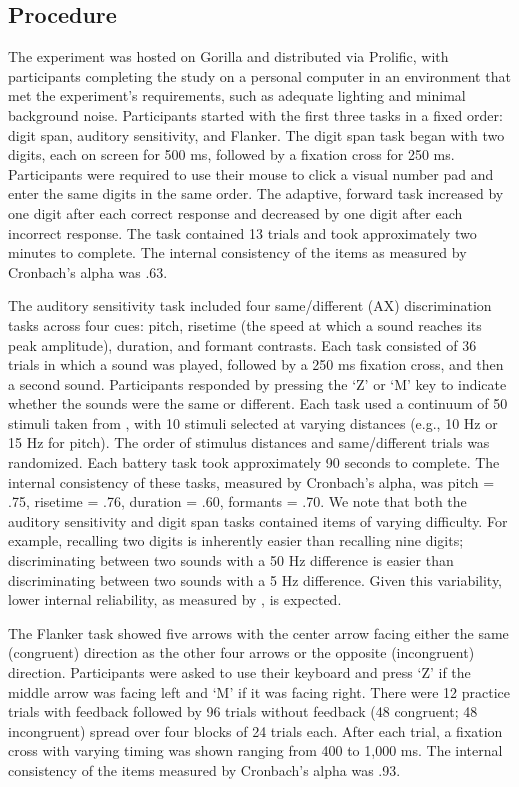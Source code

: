 \subsection{Procedure}

The experiment was hosted on Gorilla \parencite{Anwyl-Irvine_2019} and distributed via Prolific, with participants completing the study on a personal computer in an environment that met the experiment’s requirements, such as adequate lighting and minimal background noise. Participants started with the first three tasks in a fixed order: digit span, auditory sensitivity, and Flanker. The digit span task began with two digits, each on screen for 500 ms, followed by a fixation cross for 250 ms. Participants were required to use their mouse to click a visual number pad and enter the same digits in the same order. The adaptive, forward task increased by one digit after each correct response and decreased by one digit after each incorrect response. The task contained 13 trials and took approximately two minutes to complete. The internal consistency of the items as measured by Cronbach's alpha was .63. 

The auditory sensitivity task included four same/different (AX) discrimination tasks across four cues:  pitch, risetime (the speed at which a sound reaches its peak amplitude), duration, and formant contrasts. Each task consisted of 36 trials in which a sound was played, followed by a 250 ms fixation cross, and then a second sound. Participants responded by pressing the ‘Z’ or ‘M’ key to indicate whether the sounds were the same or different. Each task used a continuum of 50 stimuli taken from \parencite{Kachlicka_Saito_Tierney_2019}, with 10 stimuli selected at varying distances (e.g., 10 Hz or 15 Hz for pitch). The order of stimulus distances and same/different trials was randomized. Each battery task took approximately 90 seconds to complete. The internal consistency of these tasks, measured by Cronbach’s alpha, was pitch = .75, risetime = .76, duration = .60, formants = .70. We note that both the auditory sensitivity and digit span tasks contained items of varying difficulty. For example, recalling two digits is inherently easier than recalling nine digits; discriminating between two sounds with a 50 Hz difference is easier than discriminating between two sounds with a 5 Hz difference. Given this variability, lower internal reliability, as measured by \cite{Cronbach1951}, is expected. 

The Flanker task showed five arrows with the center arrow facing either the same (congruent) direction as the other four arrows or the opposite (incongruent) direction. Participants were asked to use their keyboard and press ‘Z’ if the middle arrow was facing left and ‘M’ if it was facing right. There were 12 practice trials with feedback followed by 96 trials without feedback (48 congruent; 48 incongruent) spread over four blocks of 24 trials each. After each trial, a fixation cross with varying timing was shown ranging from 400 to 1,000 ms. The internal consistency of the items measured by Cronbach’s alpha was .93.

